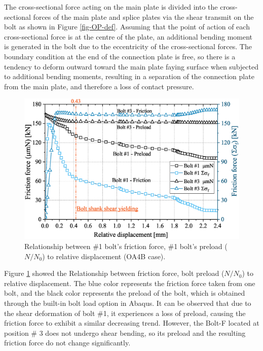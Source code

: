 The cross-sectional force acting on the main plate is divided into the cross-sectional forces of the main plate and splice plates via the shear transmit on the bolt as shown in Figure \ref{fig-OP-def}. Assuming that the point of action of each cross-sectional force is at the centre of the plate, an additional bending moment is generated in the bolt due to the eccentricity of the cross-sectional forces. The boundary condition at the end of the connection plate is free, so there is a tendency to deform outward toward the main plate faying surface when subjected to additional bending moments, resulting in a separation of the connection plate from the main plate, and therefore a loss of contact pressure.



\begin{figure}
    \centering
    \includegraphics[width=0.7\linewidth]{imgs/ch7/RD2NF.eps}
    \caption{Relationship between \#1 bolt's friction force, \#1 bolt's preload ($N/N_0$) to relative displacement (OA4B case).}
    \label{fig-RD2NF}
\end{figure}

Figure \ref{fig-RD2NF} showed the Relationship between friction force, bolt preload ($N/N_0$) to relative displacement. The blue color represents the friction force taken from one bolt, and the black color represents the preload of the bolt, which is obtained through the built-in bolt load option in Abaqus. It can be observed that due to the shear deformation of bolt \#1, it experiences a loss of preload, causing the friction force to exhibit a similar decreasing trend. However, the Bolt-F located at position \# 3 does not undergo shear bending, so its preload and the resulting friction force do not change significantly.


